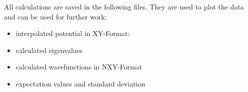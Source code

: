 \documentclass[letterpaper,10pt,english]{sphinxmanual}
\begin{document}
All calculations are saved in the following files. They are used to plot
the data and can be used for further work:
\begin{itemize}
\item {} 

interpolated potential in XY-Format:

%
\begin{sphinxVerbatim}[commandchars=\\\{\}]
 
 
    
\end{sphinxVerbatim}

\item {} 

calculated eigenvalues

%
\begin{sphinxVerbatim}[commandchars=\\\{\}]
\end{sphinxVerbatim}

\item {} 

calculated wavefunctions in NXY-Format

%
\begin{sphinxVerbatim}[commandchars=\\\{\}]
    
    
\end{sphinxVerbatim}

\item {} 

expectation values and standard deviation

%
\begin{sphinxVerbatim}[commandchars=\\\{\}]
 
 
\end{sphinxVerbatim}

\end{itemize}
\end{document}
